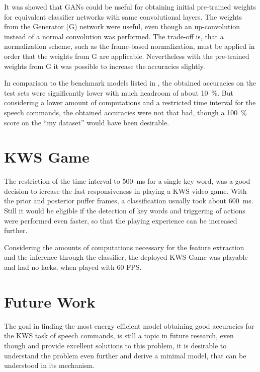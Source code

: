 It was showed that GANs could be useful for obtaining initial pre-trained weights for equivalent classifier networks with same convolutional layers.
The weights from the Generator (G) network were useful, even though an up-convolution instead of a normal convolution was performed.
The trade-off is, that a normalization scheme, such as the frame-based normalization, must be applied in order that the weights from G are applicable.
Nevertheless with the pre-trained weights from G it was possible to increase the accuracies slightly.

In comparison to the benchmark models listed in , the obtained accuracies on the test sets were significantly lower with much headroom of about \SI{10}{\percent}.
But considering a lower amount of computations and a restricted time interval for the speech commands, the obtained accuracies were not that bad, though a \SI{100}{\percent} score on the \enquote{my dataset} would have been desirable.



\section{KWS Game}
\thesisStateReady
The restriction of the time interval to \SI{500}{\milli\second} for a single key word, was a good decision to icrease the fast responsiveness in playing a KWS video game.
With the prior and posterior puffer frames, a classification usually took about \SI{600}{\milli\second}.
Still it would be eligible if the detection of key words and triggering of actions were performed even faster, so that the playing experience can be increased further.

Considering the amounts of computations necessary for the feature extraction and the inference through the classifier, the deployed KWS Game was playable and had no lacks, when played with 60 FPS.



\section{Future Work}
\thesisStateReady
The goal in finding the most energy efficient model obtaining good accuracies for the KWS task of speech commands, is still a topic in future research, even though \cite{Zhang2017} and \cite{Peter2020} provide excellent solutions to this problem, it is desirable to understand the problem even further and derive a minimal model, that can be understood in its mechanism.

